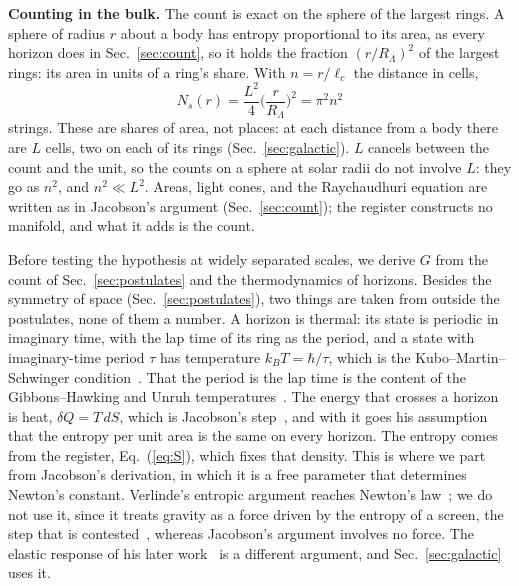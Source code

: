 \documentclass[aps,prd,twocolumn,superscriptaddress,nofootinbib,showkeys]{revtex4-2}
\makeatletter
\newcommand{\lc}{\ell_c}
\newcommand{\RL}{R_\Lambda}
\def\section{\@startsection{section}{1}{\z@}{0.6cm \@plus1ex \@minus .2ex}{0.35cm}{\normalfont\small\bfseries}}
\makeatother
\begin{document}
\textbf{Counting in the bulk.} The count is exact on the sphere of the largest rings. A sphere of radius $r$ about a body has entropy proportional to its area, as every horizon does in Sec.~\ref{sec:count}, so it holds the fraction $(r/\RL)^2$ of the largest rings: its area in units of a ring's share. With $n = r/\lc$ the distance in cells,
\begin{equation}
N_s(r) = \frac{L^2}{4}\Big(\frac{r}{\RL}\Big)^2 = \pi^2 n^2
\label{eq:N}
\end{equation}
strings. These are shares of area, not places: at each distance from a body there are $L$ cells, two on each of its rings (Sec.~\ref{sec:galactic}). $L$ cancels between the count and the unit, so the counts on a sphere at solar radii do not involve $L$: they go as $n^2$, and $n^2 \ll L^2$. Areas, light cones, and the Raychaudhuri equation are written as in Jacobson's argument (Sec.~\ref{sec:count}); the register constructs no manifold, and what it adds is the count.

\section{Newton's Constant from the Count}
\label{sec:count}

Before testing the hypothesis at widely separated scales, we derive $G$ from the count of Sec.~\ref{sec:postulates} and the thermodynamics of horizons. Besides the symmetry of space (Sec.~\ref{sec:postulates}), two things are taken from outside the postulates, none of them a number. A horizon is thermal: its state is periodic in imaginary time, with the lap time of its ring as the period, and a state with imaginary-time period $\tau$ has temperature $k_BT = \hbar/\tau$, which is the Kubo--Martin--Schwinger condition~\cite{kubo1957,martin1959}. That the period is the lap time is the content of the Gibbons--Hawking and Unruh temperatures~\cite{gibbons1977,unruh1976}. The energy that crosses a horizon is heat, $\delta Q = T\,dS$, which is Jacobson's step~\cite{jacobson1995}, and with it goes his assumption that the entropy per unit area is the same on every horizon. The entropy comes from the register, Eq.~(\ref{eq:S}), which fixes that density. This is where we part from Jacobson's derivation, in which it is a free parameter that determines Newton's constant. Verlinde's entropic argument reaches Newton's law~\cite{verlinde2011}; we do not use it, since it treats gravity as a force driven by the entropy of a screen, the step that is contested~\cite{visser2011,kobakhidze2011}, whereas Jacobson's argument involves no force. The elastic response of his later work~\cite{verlinde2017} is a different argument, and Sec.~\ref{sec:galactic} uses it.
\end{document}
